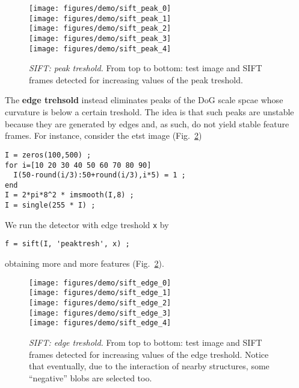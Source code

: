 \documentclass{article}
\begin{document}
\begin{figure}
\begin{center}
\texttt{[image: figures/demo/sift\_peak\_0]}\\
\texttt{[image: figures/demo/sift\_peak\_1]}\\
\texttt{[image: figures/demo/sift\_peak\_2]}\\
\texttt{[image: figures/demo/sift\_peak\_3]}\\
\texttt{[image: figures/demo/sift\_peak\_4]}
\end{center}
\caption{{\em SIFT: peak treshold.} From top to bottom: test image and
  SIFT frames detected for increasing values of the peak treshold.}
\label{fig:sift-peak-tresh}
\end{figure}

The {\bf edge trehsold} instead eliminates peaks of the DoG scale
spcae whose curvature is below a certain treshold. The idea is that
such peaks are unstable because they are generated by edges and, as
such, do not yield stable feature frames. For instance, consider the etst
image (Fig.~\ref{fig:sift-edge-tresh})
\begin{verbatim}
I = zeros(100,500) ;
for i=[10 20 30 40 50 60 70 80 90]
  I(50-round(i/3):50+round(i/3),i*5) = 1 ;
end
I = 2*pi*8^2 * imsmooth(I,8) ;
I = single(255 * I) ;
\end{verbatim}
We run the detector with edge treshold \verb$x$ by
\begin{verbatim}
f = sift(I, 'peaktresh', x) ;
\end{verbatim}
obtaining more and more features (Fig.~\ref{fig:sift-edge-tresh}).

\begin{figure}
\begin{center}
\texttt{[image: figures/demo/sift\_edge\_0]}\\
\texttt{[image: figures/demo/sift\_edge\_1]}\\
\texttt{[image: figures/demo/sift\_edge\_2]}\\
\texttt{[image: figures/demo/sift\_edge\_3]}\\
\texttt{[image: figures/demo/sift\_edge\_4]}
\end{center}
\caption{{\em SIFT: edge treshold.} From top to bottom: test image and
  SIFT frames detected for increasing values of the edge
  treshold. Notice that eventually, due to the interaction of nearby
  structures, some ``negative'' blobs are selected too.}
\label{fig:sift-edge-tresh}
\end{figure}
\end{document}
